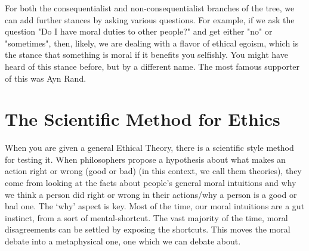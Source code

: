 For both the consequentialist and non-consequentialist branches of the tree, we can add further stances by asking various questions. For example, if we ask the question "Do I have moral duties to other people?" and get either "no" or "sometimes", then, likely, we are dealing with a flavor of ethical egoism, which is the stance that something is moral if it benefits you selfishly. You might have heard of this stance before, but by a different name. The most famous supporter of this was Ayn Rand.

\section{The Scientific Method for Ethics}

When you are given a general Ethical Theory, there is a scientific style method for testing it. When philosophers propose a hypothesis about what makes an action right or wrong (good or bad) (in this context, we call them theories), they come from looking at the facts about people’s general moral intuitions and why we think a person did right or wrong in their actions/why a person is a good or bad one.  The ‘why’ aspect is key. Most of the time, our moral intuitions are a gut instinct, from a sort of mental-shortcut. The vast majority of the time, moral disagreements can be settled by exposing the shortcuts. This moves the moral debate into a metaphysical one, one which we can debate about. 

